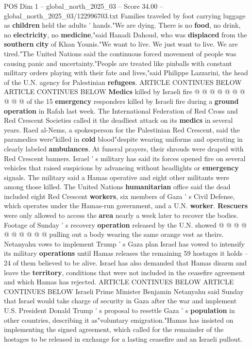 \begin{textsample}{POS Dim 1 – global\_north\_2025\_03 – Score 34.00 – global\_north\_2025\_03/122996703.txt}
Families traveled by foot carrying luggage as \textbf{children} held the adults ' hands."We are dying.
There is no \textbf{food}, no drink, no \textbf{electricity}, no \textbf{medicine},"said Hanadi Dahoud, who was \textbf{displaced} from the \textbf{southern} \textbf{city} of Khan Younis."We want to live.
We just want to live.
We are tired."The United Nations said the continuous forced movement of people was causing panic and uncertainty."People are treated like pinballs with constant military orders playing with their fate and lives,"said Philippe Lazzarini, the head of the U.N. agency for Palestinian \textbf{refugees}.
ARTICLE CONTINUES BELOW ARTICLE CONTINUES BELOW \textbf{Medics} killed by Israeli fire @ @ @ @ @ @ @ @ @ @ of the 15 \textbf{emergency} responders killed by Israeli fire during a \textbf{ground} \textbf{operation} in Rafah last week.
The International Federation of Red Cross and Red Crescent Societies called it the deadliest attack on its \textbf{medics} in several years.
Raed al-Nems, a spokesperson for the Palestinian Red Crescent, said the paramedics were"killed in \textbf{cold} blood"despite wearing uniforms and operating in clearly labeled \textbf{ambulances}.
At funeral prayers, their shrouds were draped with Red Crescent banners.
Israel ' s military has said its forces opened fire on several vehicles that raised suspicions by advancing without headlights or \textbf{emergency} signals.
The military said a Hamas operative and eight other militants were among those killed.
The United Nations \textbf{humanitarian} office said the dead included eight Red Crescent \textbf{workers}, six members of Gaza ' s Civil Defense, which operates under the Hamas-run government, and a U.N. \textbf{worker}. \textbf{Rescuers} were only allowed to access the \textbf{area} nearly a week later to recover the bodies.
Footage of Sunday ' s recovery \textbf{operation} released by the U.N. showed @ @ @ @ @ @ @ @ @ @ pulling out a body wearing the same orange vest as theirs.
Netanyahu vows to implement Trump ' s Gaza plan Israel has vowed to intensify its military \textbf{operations} until Hamas releases the remaining 59 hostages it holds -- 24 of them believed to be alive.
Israel has also demanded that Hamas disarm and leave the \textbf{territory}, conditions that were not included in the ceasefire agreement and which Hamas has rejected.
ARTICLE CONTINUES BELOW ARTICLE CONTINUES BELOW Israeli Prime Minister Benjamin Netanyahu said Sunday that Israel would take charge of security in Gaza after the war and implement U.S.
President Donald Trump ' s proposal to resettle Gaza ' s \textbf{population} in other countries, describing it as"voluntary emigration."Hamas has insisted on implementing the signed agreement, which called for the remainder of the hostages to be released in exchange for a lasting ceasefire and an Israeli pullout.

\end{textsample}
